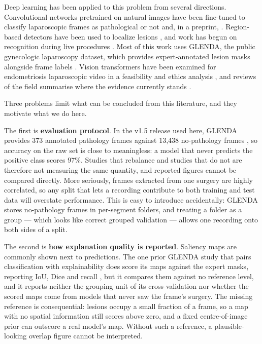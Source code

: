 \documentclass[preprint,12pt]{elsarticle}
\begin{document}
Deep learning has been applied to this problem from several directions. Convolutional networks pretrained on natural images have been fine-tuned to classify laparoscopic frames as pathological or not \cite{ref_a2,ref_a7} and, in a preprint, \cite{ref_a5}. Region-based detectors have been used to localize lesions \cite{ref_a3,ref_a6}, and work has begun on recognition during live procedures \cite{ref_a10}. Most of this work uses GLENDA, the public gynecologic laparoscopy dataset, which provides expert-annotated lesion masks alongside frame labels \cite{ref_a4}. Vision transformers have been examined for endometriosis laparoscopic video in a feasibility and ethics analysis \cite{ref_a9}, and reviews of the field summarise where the evidence currently stands \cite{ref_e1,ref_e2}.

Three problems limit what can be concluded from this literature, and they motivate what we do here.

The first is \textbf{evaluation protocol}. In the v1.5 release used here, GLENDA provides 373 annotated pathology frames against 13,438 no-pathology frames \cite{ref_glenda_web}, so accuracy on the raw set is close to meaningless: a model that never predicts the positive class scores 97\%. Studies that rebalance and studies that do not are therefore not measuring the same quantity, and reported figures cannot be compared directly. More seriously, frames extracted from one surgery are highly correlated, so any split that lets a recording contribute to both training and test data will overstate performance. This is easy to introduce accidentally: GLENDA stores no-pathology frames in per-segment folders, and treating a folder as a group --- which looks like correct grouped validation --- allows one recording onto both sides of a split.

The second is \textbf{how explanation quality is reported}. Saliency maps are commonly shown next to predictions. The one prior GLENDA study that pairs classification with explainability does score its maps against the expert masks, reporting IoU, Dice and recall \cite{ref_a1}, but it compares them against no reference level, and it reports neither the grouping unit of its cross-validation nor whether the scored maps come from models that never saw the frame's surgery. The missing reference is consequential: lesions occupy a small fraction of a frame, so a map with no spatial information still scores above zero, and a fixed centre-of-image prior can outscore a real model's map. Without such a reference, a plausible-looking overlap figure cannot be interpreted.
\end{document}
